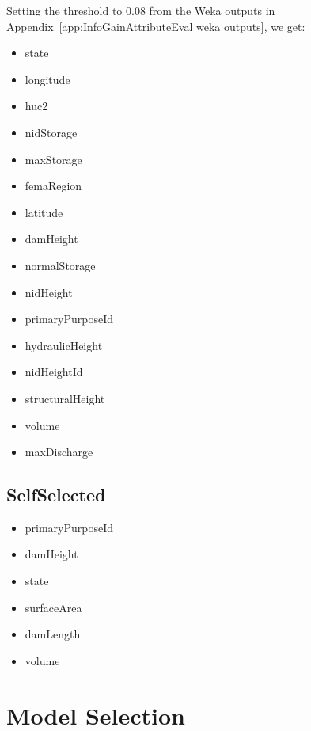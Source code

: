 \documentclass{article}
\begin{document}
Setting the threshold to 0.08 from the Weka outputs in Appendix~\ref{app:InfoGainAttributeEval weka outputs}, we get:
\begin{multicols}{2}
    \begin{itemize}
        \item state
        \item longitude
        \item huc2
        \item nidStorage
        \item maxStorage
        \item femaRegion
        \item latitude
        \item damHeight
        \item normalStorage
        \item nidHeight
        \item primaryPurposeId
        \item hydraulicHeight
        \item nidHeightId
        \item structuralHeight
        \item volume
        \item maxDischarge
    \end{itemize}
\end{multicols}

    


\subsection{SelfSelected}

\begin{multicols}{2}
    \begin{itemize}
        \item primaryPurposeId
        \item damHeight
        \item state
        \item surfaceArea
        \item damLength
        \item volume
    \end{itemize}
\end{multicols}


\section{Model Selection}
\end{document}
